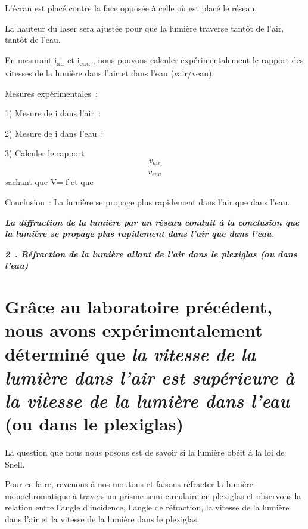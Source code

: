 L'écran est placé contre la face opposée à celle où est placé le réseau.

La hauteur du laser sera ajustée pour que la lumière traverse tantôt de
l'air, tantôt de l'eau.

En mesurant i\textsubscript{air} et i\textsubscript{eau }, nous pouvons
calculer expérimentalement le rapport des vitesses de la lumière dans
l'air et dans l'eau (vair/veau).

Mesures expérimentales~:

1) Mesure de i dans l'air~:

2) Mesure de i dans l'eau~:

3) Calculer le rapport
\[\frac{v_{\mathit{\text{air}}}}{v_{\mathit{\text{eau}}}}{}\] sachant
que V=f et que

Conclusion~: La lumière se propage plus rapidement dans l'air que dans
l'eau.

\emph{\textbf{La diffraction de la lumière par un réseau conduit à la
conclusion que la lumière se propage plus rapidement dans l'air que dans
l'eau.}}

\emph{\textbf{2~. Réfraction de la lumière allant de l'air dans le
plexiglas (ou dans l'eau)}}

\hypertarget{gruxe2ce-au-laboratoire-pruxe9cuxe9dent-nous-avons-expuxe9rimentalement-duxe9terminuxe9-que-la-vitesse-de-la-lumiuxe8re-dans-lair-est-supuxe9rieure-uxe0-la-vitesse-de-la-lumiuxe8re-dans-leau-ou-dans-le-plexiglas}{%
\section{\texorpdfstring{Grâce au laboratoire précédent, nous avons
expérimentalement déterminé que \emph{la vitesse de la lumière dans
l'air est supérieure à la vitesse de la lumière dans l'eau} (ou dans le
plexiglas)}{Grâce au laboratoire précédent, nous avons expérimentalement déterminé que la vitesse de la lumière dans l'air est supérieure à la vitesse de la lumière dans l'eau (ou dans le plexiglas)}}\label{gruxe2ce-au-laboratoire-pruxe9cuxe9dent-nous-avons-expuxe9rimentalement-duxe9terminuxe9-que-la-vitesse-de-la-lumiuxe8re-dans-lair-est-supuxe9rieure-uxe0-la-vitesse-de-la-lumiuxe8re-dans-leau-ou-dans-le-plexiglas}}

La question que nous nous posons est de savoir si la lumière obéit à la
loi de Snell.

Pour ce faire, revenons à nos moutons et faisons réfracter la lumière
monochromatique à travers un prisme semi-circulaire en plexiglas et
observons la relation entre l'angle d'incidence, l'angle de réfraction,
la vitesse de la lumière dans l'air et la vitesse de la lumière dans le
plexiglas.

